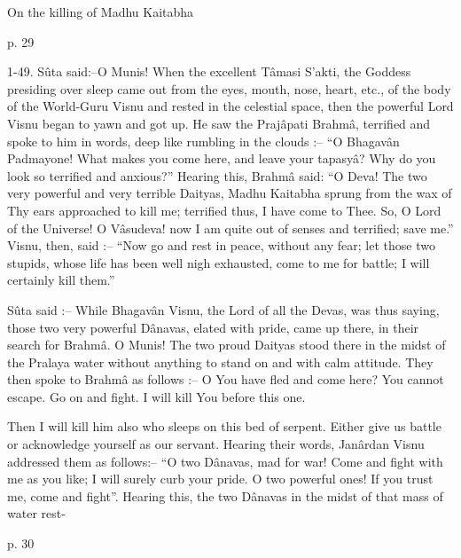 On the killing of Madhu Kaitabha

 

p. 29

 

1-49. Sûta said:--O Munis! When the excellent Tâmasi S’akti, the Goddess presiding over sleep came out from the eyes, mouth, nose, heart, etc., of the body of the World-Guru Visnu and rested in the celestial space, then the powerful Lord Visnu began to yawn and got up. He saw the Prajâpati Brahmâ, terrified and spoke to him in words, deep like rumbling in the clouds :-- “O Bhagavân Padmayone! What makes you come here, and leave your tapasyâ? Why do you look so terrified and anxious?” Hearing this, Brahmâ said: “O Deva! The two very powerful and very terrible Daityas, Madhu Kaitabha sprung from the wax of Thy ears approached to kill me; terrified thus, I have come to Thee. So, O Lord of the Universe! O Vâsudeva! now I am quite out of senses and terrified; save me.” Visnu, then, said :-- “Now go and rest in peace, without any fear; let those two stupids, whose life has been well nigh exhausted, come to me for battle; I will certainly kill them.”

 

Sûta said :-- While Bhagavân Visnu, the Lord of all the Devas, was thus saying, those two very powerful Dânavas, elated with pride, came up there, in their search for Brahmâ. O Munis! The two proud Daityas stood there in the midst of the Pralaya water without anything to stand on and with calm attitude. They then spoke to Brahmâ as follows :-- O You have fled and come here? You cannot escape. Go on and fight. I will kill You before this one.

 

Then I will kill him also who sleeps on this bed of serpent. Either give us battle or acknowledge yourself as our servant. Hearing their words, Janârdan Visnu addressed them as follows:-- “O two Dânavas, mad for war! Come and fight with me as you like; I will surely curb your pride. O two powerful ones! If you trust me, come and fight”. Hearing this, the two Dânavas in the midst of that mass of water rest-

 

p. 30

 

